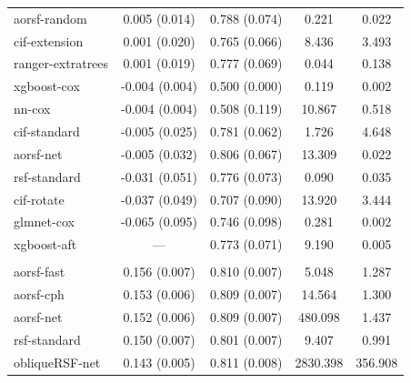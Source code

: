 \documentclass{article}\usepackage[]{graphicx}\usepackage[]{xcolor}
\newenvironment{knitrout}{}{} %
\begin{document}
\begin{knitrout}
\begin{longtable}[t]{lcccc}
\hspace{1em}aorsf-random & 0.005 (0.014) & 0.788 (0.074) & 0.221 & 0.022\\
\hspace{1em}cif-extension & 0.001 (0.020) & 0.765 (0.066) & 8.436 & 3.493\\
\hspace{1em}ranger-extratrees & 0.001 (0.019) & 0.777 (0.069) & 0.044 & 0.138\\
\hspace{1em}xgboost-cox & -0.004 (0.004) & 0.500 (0.000) & 0.119 & 0.002\\
\hspace{1em}nn-cox & -0.004 (0.004) & 0.508 (0.119) & 10.867 & 0.518\\
\hspace{1em}cif-standard & -0.005 (0.025) & 0.781 (0.062) & 1.726 & 4.648\\
\hspace{1em}aorsf-net & -0.005 (0.032) & 0.806 (0.067) & 13.309 & 0.022\\
\hspace{1em}rsf-standard & -0.031 (0.051) & 0.776 (0.073) & 0.090 & 0.035\\
\hspace{1em}cif-rotate & -0.037 (0.049) & 0.707 (0.090) & 13.920 & 3.444\\
\hspace{1em}glmnet-cox & -0.065 (0.095) & 0.746 (0.098) & 0.281 & 0.002\\
\hspace{1em}xgboost-aft & --- & 0.773 (0.071) & 9.190 & 0.005\\
\addlinespace[0.3em]
\multicolumn{5}{l}{\textit{\textbf{ARIC; coronary heart disease, n = 13623, p = 41}}}\\
\hline
\hspace{1em}aorsf-fast & 0.156 (0.007) & 0.810 (0.007) & 5.048 & 1.287\\
\hspace{1em}aorsf-cph & 0.153 (0.006) & 0.809 (0.007) & 14.564 & 1.300\\
\hspace{1em}aorsf-net & 0.152 (0.006) & 0.809 (0.007) & 480.098 & 1.437\\
\hspace{1em}rsf-standard & 0.150 (0.007) & 0.801 (0.007) & 9.407 & 0.991\\
\hspace{1em}obliqueRSF-net & 0.143 (0.005) & 0.811 (0.008) & 2830.398 & 356.908\\

\end{longtable}
\end{knitrout}
\end{document}
